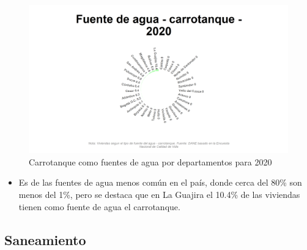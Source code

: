     \begin{figure}[H]
        \caption{Carrotanque como fuentes de agua por departamentos para 2020 \label{map_result_2} }
        \begin{center}
        \includegraphics[width=\textwidth,keepaspectratio]{img/var_147_static.png}
        \end{center}
    \end{figure}
            \begin{itemize}
                    \item Es de las fuentes de agua menos común en el país, donde cerca del 80\% son menos del 1\%, pero se destaca que en La Guajira el 10.4\% de las viviendas tienen como fuente de agua el carrotanque.
                    \end{itemize}

    \subsection{Saneamiento}

